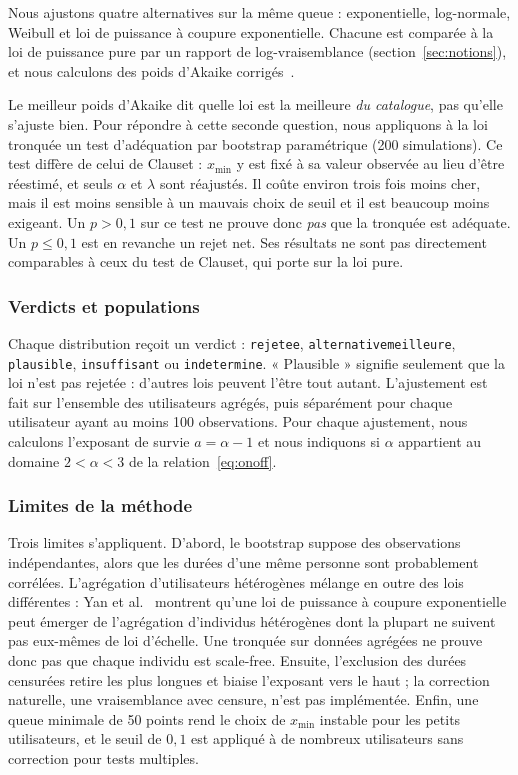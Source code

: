 \documentclass[11pt,a4paper]{article}
\newcommand{\code}[1]{\texttt{#1}}
\renewcommand{\_}{\textunderscore\penalty0\hspace{0pt}}
\begin{document}
Nous ajustons quatre alternatives sur la même queue : exponentielle, log-normale, Weibull et
loi de puissance à coupure exponentielle. Chacune est comparée à la loi de puissance pure par
un rapport de log-vraisemblance (section~\ref{sec:notions}), et nous calculons des poids
d'Akaike corrigés~\cite{burnham2002}.

Le meilleur poids d'Akaike dit quelle loi est la meilleure \emph{du catalogue}, pas qu'elle
s'ajuste bien. Pour répondre à cette seconde question, nous appliquons à la loi tronquée un
test d'adéquation par bootstrap paramétrique (200 simulations). Ce test diffère de celui de
Clauset : $x_{\min}$ y est fixé à sa valeur observée au lieu d'être réestimé, et seuls
$\alpha$ et $\lambda$ sont réajustés. Il coûte environ trois fois moins cher, mais il est
moins sensible à un mauvais choix de seuil et il est beaucoup moins exigeant. Un $p>0{,}1$
sur ce test ne prouve donc \emph{pas} que la tronquée est adéquate. Un $p\le0{,}1$ est en
revanche un rejet net. Ses résultats ne sont pas directement comparables à ceux du test de
Clauset, qui porte sur la loi pure.

\subsubsection{Verdicts et populations}

Chaque distribution reçoit un verdict : \code{rejetee}, \code{alternative\_meilleure},
\code{plausible}, \code{insuffisant} ou \code{indetermine}. « Plausible » signifie seulement
que la loi n'est pas rejetée : d'autres lois peuvent l'être tout autant. L'ajustement est
fait sur l'ensemble des utilisateurs agrégés, puis séparément pour chaque utilisateur ayant
au moins 100 observations. Pour chaque ajustement, nous calculons l'exposant de survie
$a=\alpha-1$ et nous indiquons si $\alpha$ appartient au domaine $2<\alpha<3$ de la
relation~\eqref{eq:onoff}.

\subsubsection{Limites de la méthode}

Trois limites s'appliquent. D'abord, le bootstrap suppose des observations indépendantes,
alors que les durées d'une même personne sont probablement corrélées. L'agrégation
d'utilisateurs hétérogènes mélange en outre des lois différentes : Yan et al.~\cite{yan2013}
montrent qu'une loi de puissance à coupure exponentielle peut émerger de l'agrégation
d'individus hétérogènes dont la plupart ne suivent pas eux-mêmes de loi d'échelle. Une
tronquée sur données agrégées ne prouve donc pas que chaque individu est scale-free.
Ensuite, l'exclusion des durées censurées retire les plus longues et biaise l'exposant vers
le haut ; la correction naturelle, une vraisemblance avec censure, n'est pas implémentée.
Enfin, une queue minimale de 50 points rend le choix de $x_{\min}$ instable pour les petits
utilisateurs, et le seuil de $0{,}1$ est appliqué à de nombreux utilisateurs sans correction
pour tests multiples.
\end{document}
